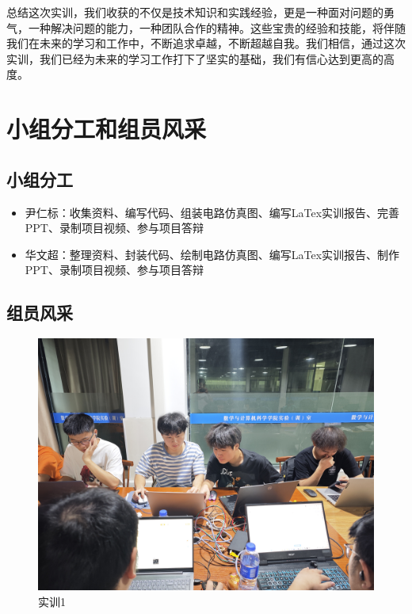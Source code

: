 \documentclass{textreportclass}  %
\begin{document}
	总结这次实训，我们收获的不仅是技术知识和实践经验，更是一种面对问题的勇气，一种解决问题的能力，一种团队合作的精神。这些宝贵的经验和技能，将伴随我们在未来的学习和工作中，不断追求卓越，不断超越自我。我们相信，通过这次实训，我们已经为未来的学习工作打下了坚实的基础，我们有信心达到更高的高度。
	
	
\section{小组分工和组员风采}					%


\subsection{小组分工}	
	\begin{itemize}
		\item 尹仁标：收集资料、编写代码、组装电路仿真图、编写LaTex实训报告、完善PPT、录制项目视频、参与项目答辩
		
		
		\item 华文超：整理资料、封装代码、绘制电路仿真图、编写LaTex实训报告、制作PPT、录制项目视频、参与项目答辩
		
	\end{itemize}


\subsection{组员风采}	
	\begin{figure}[htbp]
		\centering
		\includegraphics[scale=0.1]{Fig/1.jpg}
		\caption{实训1}\label{Fig.42}
	\end{figure}
	
\end{document}
